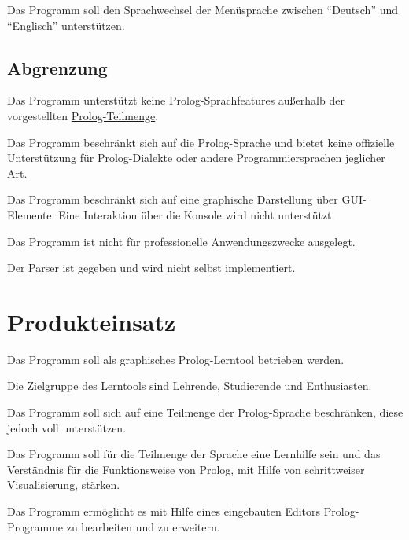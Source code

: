 \documentclass[parskip=full,11pt,twoside]{scrartcl}
\begin{document}
Das Programm soll den Sprachwechsel der Menüsprache zwischen \enquote{Deutsch} und \enquote{Englisch} unterstützen.

\subsection{Abgrenzung}


Das Programm unterstützt keine Prolog-Sprachfeatures außerhalb der vorgestellten \hyperref[prolog-language]{Prolog-Teilmenge}.


Das Programm beschränkt sich auf die Prolog-Sprache und bietet keine offizielle Unterstützung für Prolog-Dialekte oder andere Programmiersprachen jeglicher Art.


Das Programm beschränkt sich auf eine graphische Darstellung über GUI-Elemente. Eine Interaktion über die Konsole wird nicht unterstützt.


Das Programm ist nicht für professionelle Anwendungszwecke ausgelegt.


Der Parser ist gegeben und wird nicht selbst implementiert.

\pagebreak
\section{Produkteinsatz}

Das Programm soll als graphisches Prolog-Lerntool betrieben werden.

Die Zielgruppe des Lerntools sind Lehrende, Studierende und Enthusiasten.

Das Programm soll sich auf eine Teilmenge der Prolog-Sprache beschränken, diese jedoch voll unterstützen.

Das Programm soll für die Teilmenge der Sprache eine Lernhilfe sein und das Verständnis für die Funktionsweise von Prolog, mit Hilfe von schrittweiser Visualisierung, stärken.

Das Programm ermöglicht es mit Hilfe eines eingebauten Editors Prolog-Programme zu bearbeiten und zu erweitern.
\end{document}
